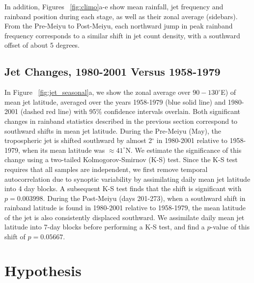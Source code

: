 	In addition, Figures ~\ref{fig:climo}a-e show mean rainfall, jet frequency and rainband position during each stage, as well as their zonal average (sidebars). From the Pre-Meiyu to Post-Meiyu, each northward jump in peak rainband frequency corresponds to a similar shift in jet count density, with a southward offset of about 5 degrees.
	
\subsection{Jet Changes, 1980-2001 Versus 1958-1979}

	In Figure ~\ref{fig:jet_seasonal}a, we show the zonal average over $90-130^\circ$E) of mean jet latitude, averaged over the years 1958-1979 (blue solid line) and 1980-2001 (dashed red line) with 95\% confidence intervals overlain. Both significant changes in rainband statistics described in the previous section correspond to southward shifts in mean jet latitude. During the Pre-Meiyu (May), the tropospheric jet is shifted southward by almost 2$^{\circ}$ in 1980-2001 relative to 1958-1979, when its mean latitude was $\approx 41^{\circ}$N. We estimate the significance of this change using a two-tailed Kolmogorov-Smirnov (K-S) test. Since the K-S test requires that all samples are independent, we first remove temporal autocorrelation due to synoptic variability by assimilating daily mean jet latitude into 4 day blocks. A subsequent K-S test finds that the shift is significant with $p=0.003998$. During the Post-Meiyu (days 201-273), when a southward shift in rainband latitude is found in 1980-2001 relative to 1958-1979, the mean latitude of the jet is also consistently displaced southward. We assimilate daily mean jet latitude into 7-day blocks before performing a K-S test, and find a $p$-value of this shift of $p=0.05667$.
	
\section{Hypothesis}

